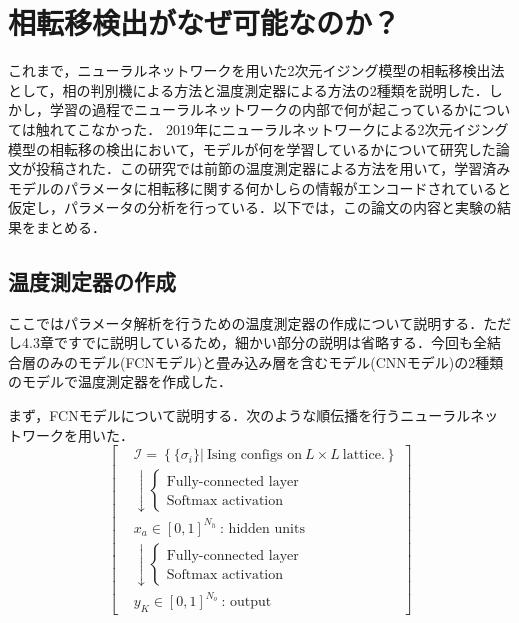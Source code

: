\documentclass[a4paper,11pt]{jsreport}
\begin{document}
\section{相転移検出がなぜ可能なのか？}
これまで，ニューラルネットワークを用いた2次元イジング模型の相転移検出法として，相の判別機による方法と温度測定器による方法の2種類を説明した．しかし，学習の過程でニューラルネットワークの内部で何が起こっているかについては触れてこなかった．
2019年にニューラルネットワークによる2次元イジング模型の相転移の検出において，モデルが何を学習しているかについて研究した論文が投稿された\cite{10.1093/ptep/ptz082}．この研究では前節の温度測定器による方法を用いて，学習済みモデルのパラメータに相転移に関する何かしらの情報がエンコードされていると仮定し，パラメータの分析を行っている．以下では，この論文の内容と実験の結果をまとめる．
\subsection{温度測定器の作成}
ここではパラメータ解析を行うための温度測定器の作成について説明する．ただし4.3章ですでに説明しているため，細かい部分の説明は省略する．今回も全結合層のみのモデル(FCNモデル)と畳み込み層を含むモデル(CNNモデル)の2種類のモデルで温度測定器を作成した．\par
まず，FCNモデルについて説明する．次のような順伝播を行うニューラルネットワークを用いた．
\begin{equation}
  \left[
    \begin{aligned}
       & \mathcal{I} = \left\{ \{ \sigma_i \} \Big| \ \text{Ising configs on} \ L \times L \ \text{lattice.} \right\} \\
       & \downarrow
      \begin{cases}
        \text{Fully-connected layer} \\
        \text{Softmax activation}
      \end{cases}                                                                            \\
       & x_a \in [0,1]^{N_h} \ \text{: hidden units}                                                                  \\
       & \downarrow
      \begin{cases}
        \text{Fully-connected layer} \\
        \text{Softmax activation}
      \end{cases}                                                                            \\
       & y_K \in [0,1]^{N_o} \ \text{: output}
    \end{aligned}
    \right]
\end{equation}
\end{document}
